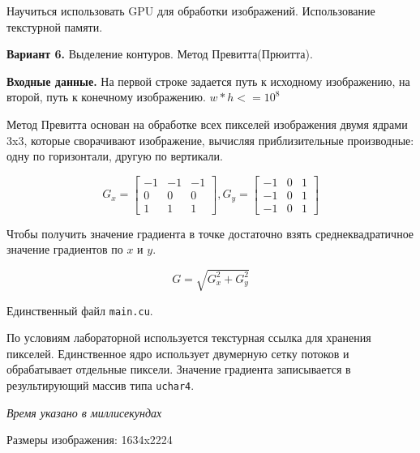 \documentclass[12pt]{article}
\begin{document}


Научиться использовать GPU для обработки изображений.
Использование текстурной памяти.

\textbf{Вариант 6.} Выделение контуров. Метод Превитта(Прюитта).

\textbf{Входные данные.} На первой строке задается путь к исходному изображению,
на второй, путь к конечному изображению. $w*h <= 10^8$

\nvidia


Метод Превитта основан на обработке всех пикселей изображения двумя ядрами 3x3,
которые сворачивают изображение, вычисляя приблизительные производные:
одну по горизонтали, другую по вертикали.

\[
	G_x = \begin{bmatrix}
		-1 & -1 & -1 \\
		0  & 0  & 0  \\
		1  & 1  & 1
	\end{bmatrix},
	G_y = \begin{bmatrix}
		-1 & 0 & 1 \\
		-1 & 0 & 1 \\
		-1 & 0 & 1
	\end{bmatrix}
\]

Чтобы получить значение градиента в точке достаточно взять среднеквадратичное значение градиентов по $x$ и $y$.

\[
	G=\sqrt{G_x^2+G_y^2}
\]

Единственный файл \lstinline|main.cu|.

По условиям лабораторной используется текстурная ссылка для хранения пикселей.
Единственное ядро использует двумерную сетку потоков и обрабатывает отдельные пиксели.
Значение градиента записывается в результирующий массив типа \lstinline|uchar4|.

{
\scriptsize
{}
}

\newpage


\textit{Время указано в миллисекундах}

Размеры изображения: 1634x2224
\end{document}

